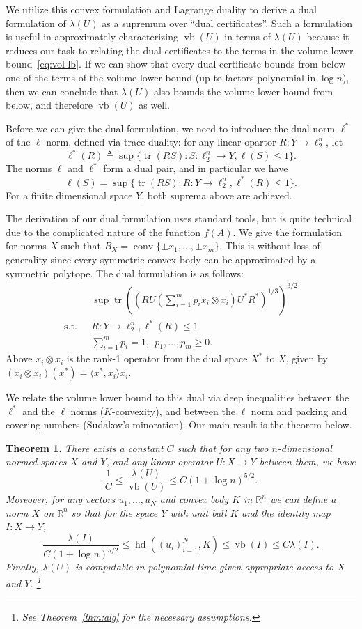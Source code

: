 \documentclass[11pt]{article}
\newtheorem{theorem}{Theorem}
\newcommand{\R}{{\mathbb{R}}}
\newcommand{\eqdef}{\triangleq}
\DeclareMathOperator{\hd}{hd}
\DeclareMathOperator{\vb}{vb}
\DeclareMathOperator{\conv}{conv}
\DeclareMathOperator{\tr}{tr}
\begin{document}
 We utilize this convex formulation
and Lagrange duality to derive a
dual formulation of $\lambda(U)$ as a supremum over ``dual
certificates''. Such a formulation is useful in approximately
characterizing $\vb(U)$ in terms of $\lambda(U)$ because it reduces
our task to relating the dual certificates to the terms in
the volume lower bound~\eqref{eq:vol-lb}. If we can show that every
dual certificate bounds from below one of the terms of the volume
lower bound (up to factors polynomial in $\log n$), then we can
conclude that $\lambda(U)$ also bounds the volume lower bound from
below, and therefore $\vb(U)$ as well. 

Before we can give the dual formulation, we need to introduce the
dual norm $\ell^*$ of the $\ell$-norm, defined via trace duality: for
any linear opartor $R: Y \to \ell_2^n$, let
\[
\ell^*(R) \eqdef \sup\{\tr(RS): S: \ell_2^n \to Y, \ell(S) \le 1\}.
\]
The norms $\ell$ and $\ell^*$ form a dual pair, and in particular we have
\[
\ell(S) = \sup\{\tr(RS): R:Y\to\ell_2^n, \ell^*(R) \le 1\}.
\]
For a finite dimensional space $Y$, both suprema above are achieved.

The derivation of our dual formulation uses
standard tools, but is quite technical due to the complicated nature
of the function $f(A)$. We give the formulation for norms $X$ such
that $B_X = \conv\{\pm x_1, \ldots, \pm x_m\}$. This is without loss
of generality since every symmetric convex body can be approximated by
a symmetric polytope. The dual formulation is as follows:
\begin{align*}
  &\sup \tr((RU(\sum_{i = 1}^m{p_i x_i \otimes  x_i})U^*R^*)^{1/3})^{3/2}\\
  \text{s.t.}\ \ \ 
  &R: Y \to \ell_2^n, \ell^*(R) \le 1 \\
  &\sum_{i = 1}^m{p_i} = 1, \ \ 
  p_1, \ldots, p_m \ge 0. 
\end{align*}
Above $x_i \otimes x_i$ is the rank-1 operator from the dual space
$X^*$ to $X$, given by $(x_i \otimes x_i)(x^*) = \langle x^*,
x_i\rangle x_i$. 

We relate  the volume lower bound to this dual via deep inequalities
between the $\ell^*$ and the $\ell$ norms ($K$-convexity), and between the
$\ell$ norm and packing and covering numbers (Sudakov's
minoration). Our main result is the theorem below.

\begin{theorem}\label{thm:fact-main}
  There exists a constant $C$ such that for any two $n$-dimensional
  normed spaces $X$ and $Y$, and any linear operator $U:X \to Y$
  between them, we have
  \[
  \frac1C \le \frac{\lambda(U)}{\vb(U)} \le C (1 + \log n)^{5/2}.
  \]
  Moreover, for any vectors $u_1, \ldots, u_N$ and convex body $K$ in
  $\R^n$ we can define a norm $X$ on $\R^n$ so that for the space $Y$
  with unit ball $K$ and the identity map $I:X \to Y$,
  \[
  \frac{\lambda(I)}{C(1 + \log n)^{5/2}} 
  \le \hd((u_i)_{i = 1}^N, K) \le \vb(I) 
  \le C \lambda(I).
  \]
  Finally, $\lambda(U)$ is computable in polynomial time given
  appropriate access to $X$ and $Y$.
  \footnote{See Theorem~\ref{thm:alg} for the necessary assumptions.}
\end{theorem}
\end{document}
